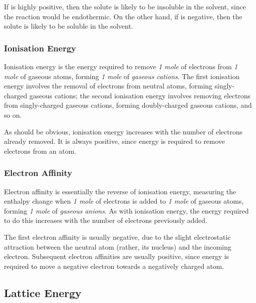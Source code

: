 				If  is highly positive, then the solute is likely to be insoluble in the solvent, since the reaction would be
				endothermic. On the other hand, if  is negative, then the solute is likely to be soluble in the solvent.


			\subsubsection{Ionisation Energy}

				Ionisation energy is the energy required to remove \emph{1 mole} of electrons from \emph{1 mole} of gaseous atoms, forming
				\emph{1 mole} of \emph{gaseous cations}. The first ionisation energy involves the removal of electrons from neutral atoms,
				forming singly-charged gaseous cations; the second ionisation energy involves removing electrons from singly-charged gaseous
				cations, forming doubly-charged gaseous cations, and so on.

				As should be obvious, ionisation energy increases with the number of electrons already removed. It is always positive,
				since energy is required to remove electrons from an atom.


			\subsubsection{Electron Affinity}

				Electron affinity is essentially the reverse of ionisation energy, measuring the enthalpy change when \emph{1 mole} of electrons
				is added to \emph{1 mole} of gaseous atoms, forming \emph{1 mole} of \emph{gaseous anions}. As with ionisation energy, the energy
				required to do this increases with the number of electrons previously added.

				The first electron affinity is usually negative, due to the slight electrostatic attraction between the neutral atom (rather, its
				nucleus) and the incoming electron. Subsequent electron affinities are usually positive, since energy is required to move a negative
				electron towards a negatively charged atom.



		\subsection{Lattice Energy}

